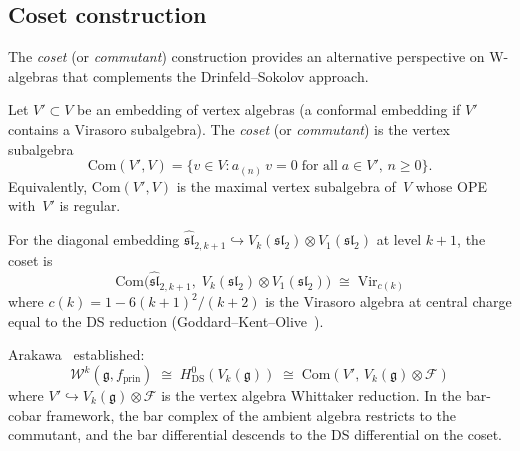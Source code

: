 \subsection{Coset construction}\label{sec:coset-construction}

The \emph{coset} (or \emph{commutant}) construction provides an
alternative perspective on W-algebras that complements the
Drinfeld--Sokolov approach.

\begin{definition}\label{def:coset}
Let $V' \subset V$ be an embedding of vertex algebras (a
conformal embedding if $V'$ contains a Virasoro subalgebra).
The \emph{coset} (or \emph{commutant}) is the vertex subalgebra
\begin{equation}\label{eq:coset-def}
\mathrm{Com}(V', V) = \{v \in V : a_{(n)}\, v = 0 \;\text{for
all}\; a \in V',\, n \geq 0\}.
\end{equation}
Equivalently, $\mathrm{Com}(V', V)$ is the maximal vertex
subalgebra of~$V$ whose OPE with~$V'$ is regular.
\end{definition}

\begin{theorem}
\label{thm:gko-coset}
For the diagonal embedding
$\widehat{\mathfrak{sl}}_{2,k+1} \hookrightarrow
V_k(\mathfrak{sl}_2) \otimes
V_1(\mathfrak{sl}_2)$ at level $k + 1$, the coset is
\begin{equation}\label{eq:gko-coset}
\mathrm{Com}\bigl(\widehat{\mathfrak{sl}}_{2,k+1},\;
V_k(\mathfrak{sl}_2) \otimes V_1(\mathfrak{sl}_2)\bigr)
\;\cong\; \mathrm{Vir}_{c(k)}
\end{equation}
where $c(k) = 1 - 6(k+1)^2/(k+2)$ is the Virasoro algebra at
central charge equal to the DS reduction
\textup{(}Goddard--Kent--Olive~\cite{GKO85}\textup{)}.
\end{theorem}

\begin{remark}\label{rem:ds-coset}
Arakawa~\cite{Arakawa17} established:
\begin{equation}\label{eq:ds-coset}
\mathcal{W}^k(\mathfrak{g}, f_{\mathrm{prin}})
\;\cong\; H^0_{\mathrm{DS}}(V_k(\mathfrak{g}))
\;\cong\; \mathrm{Com}(V',\, V_k(\mathfrak{g}) \otimes
\mathcal{F})
\end{equation}
where $V' \hookrightarrow V_k(\mathfrak{g}) \otimes \mathcal{F}$ is the vertex algebra Whittaker reduction.  In the bar-cobar framework, the bar complex of the ambient algebra restricts to the commutant, and the bar differential descends to the DS differential on the coset.
\end{remark}

